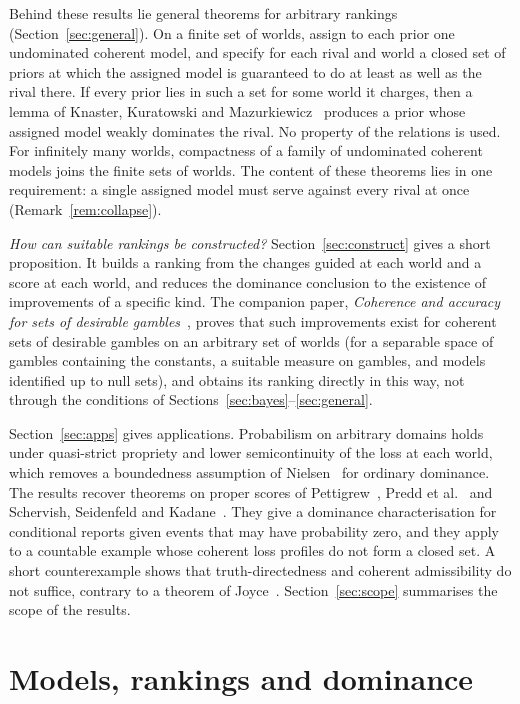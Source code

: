 \documentclass[11pt]{article}
\theoremstyle{definition}
\theoremstyle{remark}
\begin{document}
Behind these results lie general theorems for arbitrary rankings (Section~\ref{sec:general}). On a finite set of worlds, assign to each prior one undominated coherent model, and specify for each rival and world a closed set of priors at which the assigned model is guaranteed to do at least as well as the rival there. If every prior lies in such a set for some world it charges, then a lemma of Knaster, Kuratowski and Mazurkiewicz~\cite{KKM} produces a prior whose assigned model weakly dominates the rival. No property of the relations is used. For infinitely many worlds, compactness of a family of undominated coherent models joins the finite sets of worlds. The content of these theorems lies in one requirement: a single assigned model must serve against every rival at once (Remark~\ref{rem:collapse}).

\emph{How can suitable rankings be constructed?} Section~\ref{sec:construct} gives a short proposition. It builds a ranking from the changes guided at each world and a score at each world, and reduces the dominance conclusion to the existence of improvements of a specific kind. The companion paper, \emph{Coherence and accuracy for sets of desirable gambles}~\cite{KCM}, proves that such improvements exist for coherent sets of desirable gambles on an arbitrary set of worlds (for a separable space of gambles containing the constants, a suitable measure on gambles, and models identified up to null sets), and obtains its ranking directly in this way, not through the conditions of Sections~\ref{sec:bayes}--\ref{sec:general}.

Section~\ref{sec:apps} gives applications. Probabilism on arbitrary domains holds under quasi-strict propriety and lower semicontinuity of the loss at each world, which removes a boundedness assumption of Nielsen~\cite{Nielsen} for ordinary dominance. The results recover theorems on proper scores of Pettigrew~\cite{Pettigrew}, Predd et al.~\cite{Predd} and Schervish, Seidenfeld and Kadane~\cite{SSK09}. They give a dominance characterisation for conditional reports given events that may have probability zero, and they apply to a countable example whose coherent loss profiles do not form a closed set. A short counterexample shows that truth-directedness and coherent admissibility do not suffice, contrary to a theorem of Joyce~\cite{Joyce}. Section~\ref{sec:scope} summarises the scope of the results.

\section{Models, rankings and dominance}\label{sec:setting}
\end{document}

